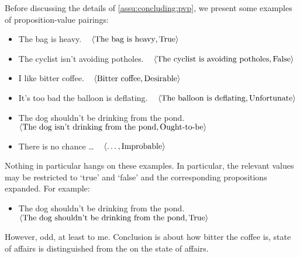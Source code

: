 \begin{note}
  Before discussing the details of \autoref{assu:concluding:pvp}, we present some examples of proposition-value pairings:

  \begin{itemize}
  \item
    The bag is heavy.\newline
    \mbox{ }\hfill%
    \(\langle \text{The bag is heavy}, \text{True} \rangle\)
  \item
    The cyclist isn't avoiding potholes.\newline
    \mbox{ }\hfill%
    \(\langle \text{The cyclist is avoiding potholes}, \text{False} \rangle\)
  \item I like bitter coffee.\newline
    \mbox{ }\hfill%
    \(\langle \text{Bitter coffee}, \text{Desirable} \rangle\)
  \item
    It's too bad the balloon is deflating.\newline
    \mbox{ }\hfill%
    \(\langle \text{The balloon is deflating}, \text{Unfortunate} \rangle\)
  \item
    The dog shouldn't be drinking from the pond.\newline
    \mbox{ }\hfill%
    \(\langle \text{The dog isn't drinking from the pond}, \text{Ought-to-be} \rangle\)
  \item
    There is no chance \dots
    \mbox{ }\hfill%
    \(\langle \text{\dots}, \text{Improbable} \rangle\)
  \end{itemize}

  Nothing in particular hangs on these examples.
  In particular, the relevant values may be restricted to `true' and `false' and the corresponding propositions expanded.
  For example:
  \begin{itemize}
  \item
    The dog shouldn't be drinking from the pond.\newline
    \mbox{ }\hfill%
    \(\langle \text{The dog shouldn't be drinking from the pond}, \text{True} \rangle\)
  \end{itemize}

  However, odd, at least to me.
  Conclusion is about how bitter the coffee is, state of affairs is distinguished from the \agpe{} on the state of affairs.
\end{note}

